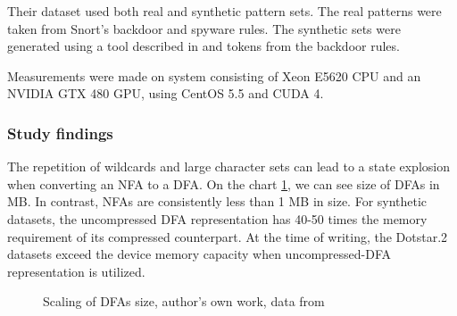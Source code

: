 \documentclass[10pt,onecolumn,twoside,english,a4paper]{article}
\begin{document}
Their dataset used both real and synthetic pattern sets. The real patterns were taken from Snort's backdoor and spyware rules. The synthetic sets were generated using a tool described in \cite{becchi2008workload} and tokens from the backdoor rules.

Measurements were made on system consisting of Xeon E5620 CPU and an NVIDIA GTX 480 GPU, using CentOS 5.5 and CUDA 4.
\subsubsection{Study findings}
The repetition of wildcards and large character sets can lead to a state explosion when converting an NFA to a DFA. On the chart \ref{dfas_size:becchi}, we can see size of DFAs in MB. In contrast, NFAs are consistently less than 1 MB in size. For synthetic datasets, the uncompressed DFA representation has 40-50 times the memory requirement of its compressed counterpart. At the time of writing, the Dotstar.2 datasets exceed the device memory capacity when uncompressed-DFA representation is utilized.
\begin{figure}[h!]
  \centering
  \caption{Scaling of DFAs size, author's own work, data from \cite{Becchi:regex_large_dataset}}
  \label{dfas_size:becchi}
\end{figure}
\end{document}
